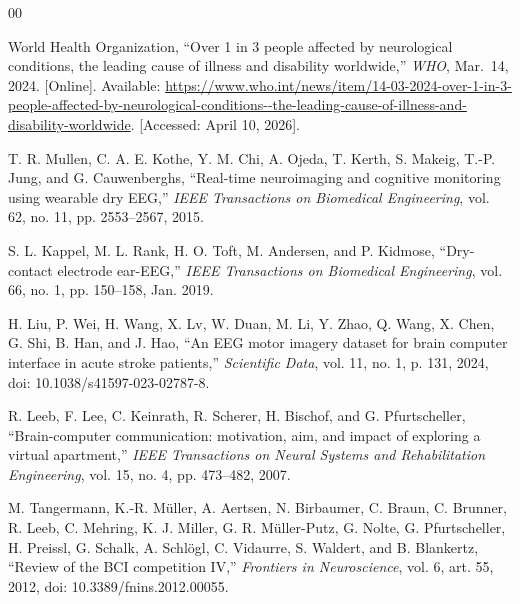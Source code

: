 \begin{thebibliography}{00}



World Health Organization, ``Over 1 in 3 people affected by neurological conditions, the leading cause of illness and disability worldwide,'' \textit{WHO}, Mar.\ 14, 2024. [Online]. Available: \url{https://www.who.int/news/item/14-03-2024-over-1-in-3-people-affected-by-neurological-conditions--the-leading-cause-of-illness-and-disability-worldwide}. [Accessed: April 10, 2026].


T. R. Mullen, C. A. E. Kothe, Y. M. Chi, A. Ojeda, T. Kerth, S. Makeig,
T.-P. Jung, and G. Cauwenberghs, ``Real-time neuroimaging and cognitive monitoring
using wearable dry EEG,'' \textit{IEEE Transactions on Biomedical Engineering},
vol. 62, no. 11, pp. 2553--2567, 2015.

S. L. Kappel, M. L. Rank, H. O. Toft, M. Andersen, and P. Kidmose,
``Dry-contact electrode ear-EEG,'' \textit{IEEE Transactions on Biomedical
Engineering}, vol. 66, no. 1, pp. 150--158, Jan. 2019.

H. Liu, P. Wei, H. Wang, X. Lv, W. Duan, M. Li, Y. Zhao, Q. Wang, X. Chen, G. Shi,
B. Han, and J. Hao, ``An EEG motor imagery dataset for brain computer interface in
acute stroke patients,'' \textit{Scientific Data}, vol. 11, no. 1, p. 131, 2024,
doi: 10.1038/s41597-023-02787-8.

R. Leeb, F. Lee, C. Keinrath, R. Scherer, H. Bischof, and G. Pfurtscheller,
``Brain-computer communication: motivation, aim, and impact of exploring a virtual
apartment,'' \textit{IEEE Transactions on Neural Systems and Rehabilitation Engineering},
vol. 15, no. 4, pp. 473--482, 2007.

M. Tangermann, K.-R. M\"{u}ller, A. Aertsen, N. Birbaumer, C. Braun, C. Brunner,
R. Leeb, C. Mehring, K. J. Miller, G. R. M\"{u}ller-Putz, G. Nolte, G. Pfurtscheller,
H. Preissl, G. Schalk, A. Schl\"{o}gl, C. Vidaurre, S. Waldert, and B. Blankertz,
``Review of the BCI competition IV,'' \textit{Frontiers in Neuroscience}, vol. 6,
art. 55, 2012, doi: 10.3389/fnins.2012.00055.


\end{thebibliography}

